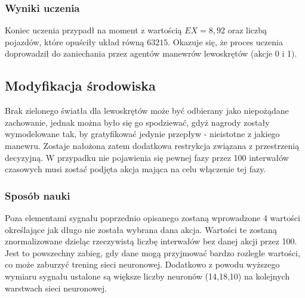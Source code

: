 \documentclass[12pt]{book}
\theoremstyle{plain}
\begin{document}
\subsubsection*{Wyniki uczenia}
Koniec uczenia przypadł na moment z wartością $EX=8,92$ oraz liczbą pojazdów, które opuściły układ równą $63 215$. Okazuje się, że proces uczenia doprowadził do zaniechania przez agentów manewrów lewoskrętów (akcje 0 i 1).  
\subsection{Modyfikacja środowiska}
Brak zielonego światła dla lewoskrętów może być odbierany jako niepożądane zachowanie, jednak można było się go spodziewać, gdyż nagrody zostały wymodelowane tak, by gratyfikować jedynie przepływ - nieistotne z jakiego manewru.
Zostaje nałożona zatem dodatkowa restrykcja związana z przestrzenią decyzyjną. W przypadku nie pojawienia się pewnej fazy przez 100 interwałów czasowych musi zostać podjęta akcja mająca na celu włączenie tej fazy.
\subsubsection*{Sposób nauki}
Poza elementami sygnału poprzednio opisanego zostaną wprowadzone 4 wartości określające jak długo nie została wybrana dana akcja. Wartości te zostaną znormalizowane dzieląc rzeczywistą liczbę interwałów bez danej akcji przez 100. Jest to powszechny zabieg, gdy dane mogą przyjmować bardzo rozległe wartości, co może zaburzyć trening sieci neuronowej. Dodatkowo z powodu wyższego wymiaru sygnału ustalone są większe liczby neuronów (14,18,10) na kolejnych warstwach sieci neuronowej.
\end{document}
